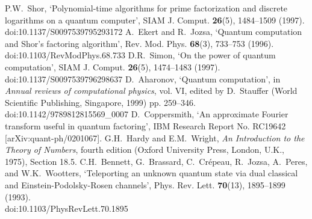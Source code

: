 \documentclass[12pt]{article}
\begin{document}
\begin{thebibliography}{99}
P.W.~Shor,
`Polynomial-time algorithms for prime factorization and discrete logarithms on a quantum computer',
SIAM J. Comput. {\bf 26}(5), 1484--1509 (1997).
doi:10.1137/S0097539795293172
%
A.~Ekert and R.~Jozsa,
`Quantum computation and Shor's factoring algorithm',
Rev. Mod. Phys. {\bf 68}(3), 733--753 (1996).
doi:10.1103/RevModPhys.68.733
%
D.R.~Simon,
`On the power of quantum computation',
SIAM J. Comput. {\bf 26}(5), 1474--1483 (1997).
doi:10.1137/S0097539796298637
%
D.~Aharonov,
`Quantum computation',
in
{\it Annual reviews of computational physics}, vol. VI,
edited by D.~Stauffer
(World Scientific Publishing, Singapore, 1999)
pp. 259--346.
doi:10.1142/9789812815569{\_}0007
%
D.~Coppersmith,
`An approximate Fourier transform useful in quantum factoring',
IBM Research Report No. RC19642 [arXiv:quant-ph/0201067].
%
G.H.~Hardy and E.M.~Wright,
{\it An Introduction to the Theory of Numbers},
fourth edition
(Oxford University Press, London, U.K., 1975),
Section 18.5.
%
C.H.~Bennett, G.~Brassard, C.~Cr{\'e}peau, R.~Jozsa, A.~Peres, and W.K.~Wootters,
`Teleporting an unknown quantum state via dual classical and Einstein-Podolsky-Rosen channels',
Phys. Rev. Lett. {\bf 70}(13), 1895--1899 (1993).
\\
doi:10.1103/PhysRevLett.70.1895
%
\end{thebibliography}
\end{document}

